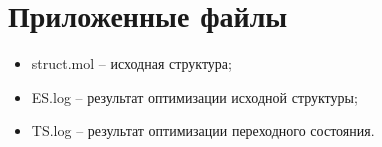 \section{Приложенные файлы}
\begin{itemize}
    \item struct.mol – исходная структура;
    \item ES.log – результат оптимизации исходной структуры;
    \item TS.log – результат оптимизации переходного состояния.
\end{itemize}{}